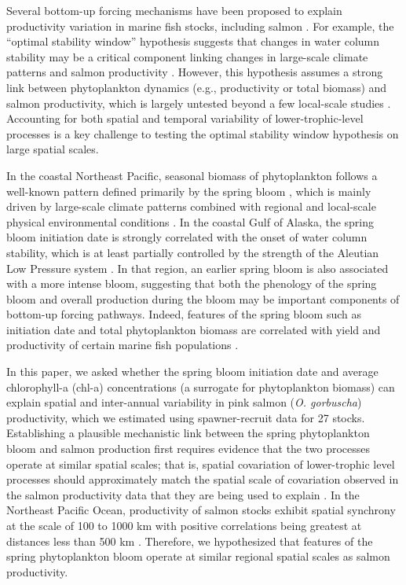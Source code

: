 Several bottom-up forcing mechanisms have been proposed to explain productivity
variation in marine fish stocks, including salmon \citep{Cushing1990a,
Gargett1997a}. For example, the ``optimal stability window'' hypothesis suggests
that changes in water column stability may be a critical component linking
changes in large-scale climate patterns and salmon productivity
\citep{Gargett1997a}. However, this hypothesis assumes a strong link between
phytoplankton dynamics (e.g., productivity or total biomass) and salmon
productivity, which is largely untested beyond a few local-scale studies
\citep{Mathews1989a, Chittenden2010a}.  Accounting for both spatial and temporal
variability of lower-trophic-level processes is a key challenge to testing the
optimal stability window hypothesis on large spatial scales.

In the coastal Northeast Pacific, seasonal biomass of phytoplankton follows a
well-known pattern defined primarily by the spring bloom \citep{Henson2007a,
Waite2013}, which is mainly driven by large-scale climate patterns combined with
regional and local-scale physical environmental conditions \citep{Sverdrup1953a,
Ware1991a, Polovina1995a, Henson2007a}. In the coastal Gulf of Alaska, the
spring bloom initiation date is strongly correlated with the onset of water
column stability, which is at least partially controlled by the strength of the
Aleutian Low Pressure system \citep{Henson2007a}. In that region, an earlier
spring bloom is also associated with a more intense bloom, suggesting that both
the phenology of the spring bloom and overall production during the bloom may be
important components of bottom-up forcing pathways. Indeed, features of the
spring bloom such as initiation date and total phytoplankton biomass are
correlated with yield and productivity of certain marine fish populations
\citep{Platt2003a, Ware2005a, Koeller2009}.

In this paper, we asked whether the spring bloom initiation date and average
chlorophyll-a (chl-a) concentrations (a surrogate for phytoplankton biomass) can
explain spatial and inter-annual variability in pink salmon (\emph{O.
gorbuscha}) productivity, which we estimated using spawner-recruit data for 27
stocks. Establishing a plausible mechanistic link between the spring
phytoplankton bloom and salmon production first requires evidence that the two
processes operate at similar spatial scales; that is, spatial covariation of
lower-trophic level processes should approximately match the spatial scale of
covariation observed in the salmon productivity data that they are being used to
explain \citep{Bjornstad1999a, Koenig1999a}. In the Northeast Pacific Ocean,
productivity of salmon stocks exhibit spatial synchrony at the scale of 100 to
1000 km \citep{Mueter2002b} with positive correlations being greatest at
distances less than 500 km \citep{Pyper2005a}. Therefore, we hypothesized that
features of the spring phytoplankton bloom operate at similar regional spatial
scales as salmon productivity.

